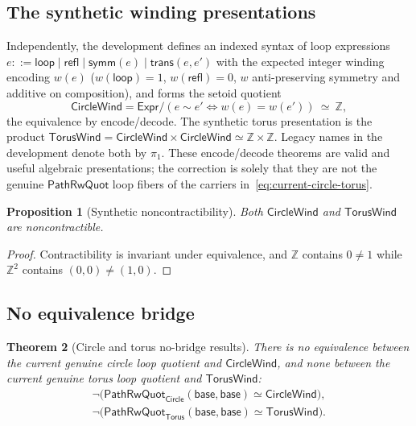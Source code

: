 \documentclass[10pt,reqno]{amsart}
\newtheorem{theorem}{Theorem}[section]
\newtheorem{proposition}[theorem]{Proposition}
\newcommand{\Eqv}{\simeq}
\newcommand{\PRW}{\mathsf{PathRwQuot}}
\begin{document}
\subsection{The synthetic winding presentations}

Independently, the development defines an indexed syntax of loop expressions
\(e::=\mathsf{loop}\mid\mathsf{refl}\mid\mathsf{symm}(e)\mid
\mathsf{trans}(e,e')\) with the expected integer winding encoding \(w(e)\)
(\(w(\mathsf{loop})=1\), \(w(\mathsf{refl})=0\), \(w\) anti-preserving symmetry
and additive on composition), and forms the setoid quotient
\[
 \mathsf{CircleWind}
 =\mathsf{Expr}/(e\sim e'\Longleftrightarrow w(e)=w(e'))
 \ \Eqv\ \mathbb Z,
\tag{13.3}\label{eq:circle-wind-int}
\]
the equivalence by encode/decode.  The synthetic torus presentation is the
product
\(\mathsf{TorusWind}=\mathsf{CircleWind}\times\mathsf{CircleWind}
\Eqv\mathbb Z\times\mathbb Z\).
Legacy names in the development denote both by \(\pi_1\).  These encode/decode
theorems are valid and useful algebraic presentations; the correction is solely
that they are not the genuine \(\PRW\) loop fibers of the carriers
in~\eqref{eq:current-circle-torus}.

\begin{proposition}[Synthetic noncontractibility]
\label{prop:synthetic-noncontractible}
Both \(\mathsf{CircleWind}\) and \(\mathsf{TorusWind}\) are noncontractible.
\end{proposition}

\begin{proof}
Contractibility is invariant under equivalence, and \(\mathbb Z\) contains
\(0\ne1\) while \(\mathbb Z^2\) contains \((0,0)\ne(1,0)\).
\end{proof}

\subsection{No equivalence bridge}

\begin{theorem}[Circle and torus no-bridge results]
\label{thm:no-bridges}
There is no equivalence between the current genuine circle loop quotient and
\(\mathsf{CircleWind}\), and none between the current genuine torus
loop quotient and \(\mathsf{TorusWind}\):
\[
\begin{aligned}
 \neg\bigl(
   \PRW_{\mathsf{Circle}}(\mathsf{base},\mathsf{base})
   \Eqv\mathsf{CircleWind}
 \bigr),\\
 \neg\bigl(
   \PRW_{\mathsf{Torus}}(\mathsf{base},\mathsf{base})
   \Eqv\mathsf{TorusWind}
 \bigr).
\end{aligned}
\tag{13.4}\label{eq:no-bridges}
\]
\end{theorem}
\end{document}
